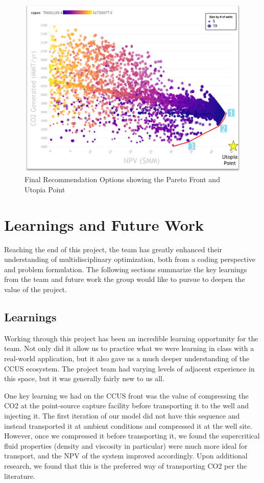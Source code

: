 \documentclass[balance,upint,subscriptcorrection,varvw,mathalfa=cal=boondoxo,spanish,french,vietnamese,russian,greek,pdf-a,colorlinks]{asmeconf}
\begin{document}
\begin{figure}
\centering\includegraphics[width=1\linewidth]{images/Final Recommendation.png}
\caption{Final Recommendation Options showing the Pareto Front and Utopia Point}
\label{Final Recommendation}
\end{figure}

\section{Learnings and Future Work}
Reaching the end of this project, the team has greatly enhanced their understanding of multidisciplinary optimization, both from a coding perspective and problem formulation. The following sections summarize the key learnings from the team and future work the group would like to pursue to deepen the value of the project.

\subsection{Learnings}
Working through this project has been an incredible learning opportunity for the team. Not only did it allow us to practice what we were learning in class with a real-world application, but it also gave us a much deeper understanding of the CCUS ecosystem. The project team had varying levels of adjacent experience in this space, but it was generally fairly new to us all.

One key learning we had on the CCUS front was the value of compressing the CO2 at the point-source capture facility before transporting it to the well and injecting it. The first iteration of our model did not have this sequence and instead transported it at ambient conditions and compressed it at the well site. However, once we compressed it before transporting it, we found the supercritical fluid properties (density and viscosity in particular) were much more ideal for transport, and the NPV of the system improved accordingly. Upon additional research, we found that this is the preferred way of transporting CO2 per the literature.
\end{document}
